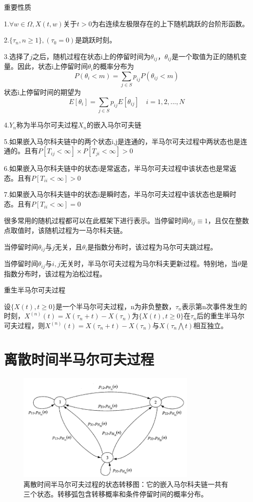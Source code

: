 \documentclass[UTF8]{ctexart}
\begin{document}
重要性质

1.$\forall w \in \Omega, X(t,w)$关于$t>0$为右连续左极限存在的上下随机跳跃的台阶形函数。

2.$\{\tau_n,n\ge1\},(\tau_0=0)$是跳跃时刻。

3.选择了$j$之后，随机过程在状态i上的停留时间为$\theta_{ij}$，$\theta_{ij}$是一个取值为正的随机变量。因此，状态i上停留时间$\theta_i$的概率分布为
$$P(\theta_{i} < m)=\sum_{j\in S} p_{ij}P(\theta_{ij} < m)$$
状态i上停留时间的期望为
$$E[\theta_{i}] = \sum_{j\in S} p_{ij}E[\theta_{ij}] \quad i=1,2,...,N$$

4.$Y_n$称为半马尔可夫过程$X_n$的嵌入马尔可夫链

5.如果嵌入马尔科夫链中的两个状态i,j是连通的，半马尔可夫过程中两状态也是连通的。且有$P[T_{ij}<\infty]\times P[T_{ji}<\infty]>0$

6.如果嵌入马尔科夫链中的状态i是常返态，半马尔可夫过程中该状态也是常返态。且有$P[T_{ii}<\infty]>0$

7.如果嵌入马尔科夫链中的状态i是瞬时态，半马尔可夫过程中该状态也是瞬时态。且有$P[T_{ii}<\infty]=0$


很多常用的随机过程都可以在此框架下进行表示。当停留时间$\theta_{ij}\equiv 1$，且仅在整数点取值时，该随机过程为一马尔科夫链。

当停留时间$\theta_{ij}$与$j$无关，且$\theta_{i}$是指数分布时，该过程为马尔可夫跳过程。

当停留时间$\theta_{ij}$与$i,j$无关时，半马尔可夫过程为马尔科夫更新过程。特别地，当$\theta$是指数分布时，该过程为泊松过程。

重生半马尔可夫过程

设$\{X(t),t\ge0\}$是一个半马尔可夫过程，n为非负整数，$\tau_n$表示第n次事件发生的时刻，$X^{(n)}(t)=X(\tau_n+t)-X(\tau_n)$为$\{X(t),t\ge 0\}$在$\tau_n$后的重生半马尔可夫过程，则$X^{(n)}(t)=X(\tau_n+t)-X(\tau_n)$与$X(\tau_n \bigwedge t)$相互独立。

\section{离散时间半马尔可夫过程}

\begin{figure}[htbp]
\centering\includegraphics[width=3.5in]{f61}
\caption{离散时间半马尔可夫过程的状态转移图：它的嵌入马尔科夫链一共有三个状态。转移弧包含转移概率和条件停留时间的概率分布。}\label{fig:1}
\end{figure}
\end{document}
